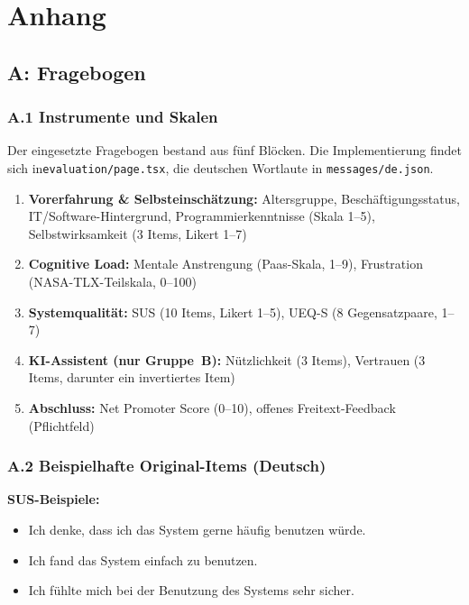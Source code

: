 \clearpage

\chapter*{\textbf{Anhang}}\label{appendix}

\section*{A: Fragebogen}

\subsection*{A.1 Instrumente und Skalen}

Der eingesetzte Fragebogen bestand aus fünf Blöcken. Die Implementierung findet sich in\linebreak \texttt{evaluation/page.tsx}, die deutschen Wortlaute in \texttt{messages/de.json}.

\begin{enumerate}
    \item \textbf{Vorerfahrung \& Selbsteinschätzung:} Altersgruppe, Beschäftigungsstatus, IT/Software-Hintergrund, Programmierkenntnisse (Skala 1--5), Selbstwirksamkeit (3 Items, Likert 1--7)
    \item \textbf{Cognitive Load:} Mentale Anstrengung (Paas-Skala, 1--9), Frustration (NASA-TLX-Teilska\-la, 0--100)
    \item \textbf{Systemqualität:} SUS (10 Items, Likert 1--5), UEQ-S (8 Gegensatzpaare, 1--7)
    \item \textbf{KI-Assistent (nur Gruppe~B):} Nützlichkeit (3 Items), Vertrauen (3 Items, darunter ein invertiertes Item)
    \item \textbf{Abschluss:} Net Promoter Score (0--10), offenes Freitext-Feedback (Pflichtfeld)
\end{enumerate}

\subsection*{A.2 Beispielhafte Original-Items (Deutsch)}

\textbf{SUS-Beispiele:}
\begin{itemize}
    \item Ich denke, dass ich das System gerne häufig benutzen würde.
    \item Ich fand das System einfach zu benutzen.
    \item Ich fühlte mich bei der Benutzung des Systems sehr sicher.
\end{itemize}

